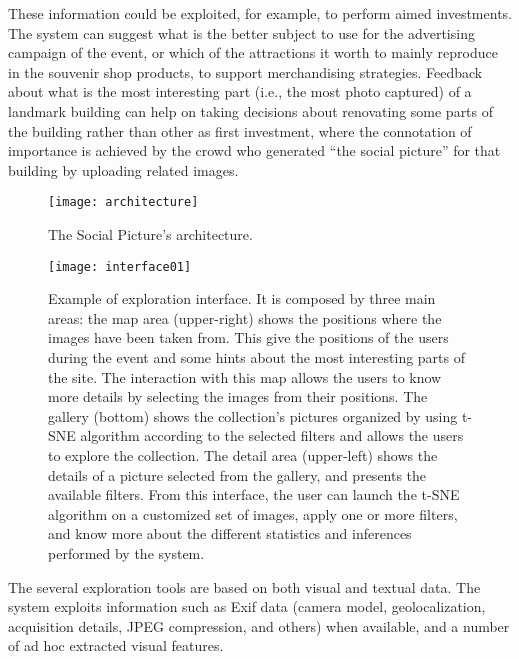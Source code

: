 These information could be exploited, for example, to perform aimed investments. The system can suggest what is the better subject to use for the advertising campaign of the event, or which of the attractions it worth to mainly reproduce in the souvenir shop products, to support merchandising strategies. Feedback about what is the most interesting part (i.e., the most photo captured) of a landmark building can help on taking decisions about renovating some parts of the building rather than other as first investment, where the connotation of importance is achieved by the crowd who generated ``the social picture'' for that building by uploading related images.
\begin{figure}
	\centering
	\texttt{[image: architecture]}
	\caption{The Social Picture's architecture.}
	\label{architecture}
\end{figure}

\begin{figure*}
	\centering
	\texttt{[image: interface01]}
	\caption{Example of exploration interface. It is composed by three main areas: the map area (upper-right) shows the positions where the images have been taken from. This give the positions of the users during the event and some hints about the most interesting parts of the site. The interaction with this map allows the users to know more details by selecting the images from their positions. The gallery (bottom) shows the collection's pictures organized by using t-SNE algorithm according to the selected filters and allows the users to explore the collection. The detail area (upper-left) shows the details of a picture selected from the gallery, and presents the available filters.
		From this interface, the user can launch the t-SNE algorithm on a customized set of images, apply one or more filters, and know more about the different statistics and inferences performed by the system.}
	\label{interface}
\end{figure*}

The several exploration tools are based on both visual and textual data. The system exploits information such as Exif data (camera model, geolocalization, acquisition details, JPEG compression, and others) when available, and a number of ad hoc extracted visual features.

